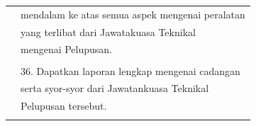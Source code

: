\documentclass[
]{article}
\begin{document}
\begin{longtable}[]{@{}ll@{}}
\begin{minipage}[t]{0.23\columnwidth}\raggedright
\strut
\end{minipage} & \begin{minipage}[t]{0.71\columnwidth}\raggedright
mendalam ke atas semua aspek mengenai peralatan\strut
\end{minipage}\tabularnewline
\begin{minipage}[t]{0.23\columnwidth}\raggedright
\strut
\end{minipage} & \begin{minipage}[t]{0.71\columnwidth}\raggedright
yang terlibat dari Jawatakuasa Teknikal\strut
\end{minipage}\tabularnewline
\begin{minipage}[t]{0.23\columnwidth}\raggedright
\strut
\end{minipage} & \begin{minipage}[t]{0.71\columnwidth}\raggedright
mengenai Pelupusan.\strut
\end{minipage}\tabularnewline
\begin{minipage}[t]{0.23\columnwidth}\raggedright
\strut
\end{minipage} & \begin{minipage}[t]{0.71\columnwidth}\raggedright
\strut
\end{minipage}\tabularnewline
\begin{minipage}[t]{0.23\columnwidth}\raggedright
\strut
\end{minipage} & \begin{minipage}[t]{0.71\columnwidth}\raggedright
36. Dapatkan laporan lengkap mengenai cadangan\strut
\end{minipage}\tabularnewline
\begin{minipage}[t]{0.23\columnwidth}\raggedright
\strut
\end{minipage} & \begin{minipage}[t]{0.71\columnwidth}\raggedright
serta syor-syor dari Jawatankuasa Teknikal\strut
\end{minipage}\tabularnewline
\begin{minipage}[t]{0.23\columnwidth}\raggedright
\strut
\end{minipage} & \begin{minipage}[t]{0.71\columnwidth}\raggedright
Pelupusan tersebut.\strut
\end{minipage}\tabularnewline
\begin{minipage}[t]{0.23\columnwidth}\raggedright
\strut
\end{minipage} & \begin{minipage}[t]{0.71\columnwidth}\raggedright

\end{minipage}
\end{longtable}
\end{document}
